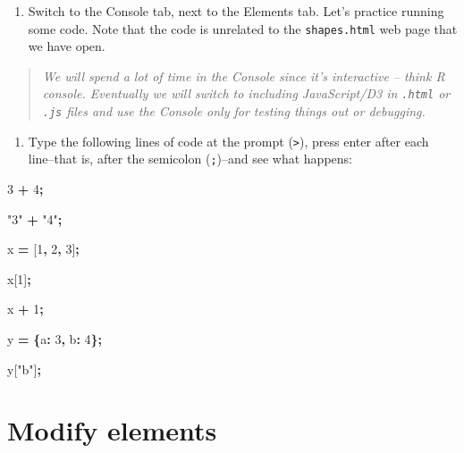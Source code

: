 \documentclass[openany]{book}
\newenvironment{Shaded}{\begin{snugshade}}{\end{snugshade}}
\newcommand{\DataTypeTok}[1]{\textcolor[rgb]{0.13,0.29,0.53}{#1}}
\newcommand{\DecValTok}[1]{\textcolor[rgb]{0.00,0.00,0.81}{#1}}
\newcommand{\NormalTok}[1]{#1}
\newcommand{\OperatorTok}[1]{\textcolor[rgb]{0.81,0.36,0.00}{\textbf{#1}}}
\newcommand{\StringTok}[1]{\textcolor[rgb]{0.31,0.60,0.02}{#1}}
\providecommand{\tightlist}{%
  \setlength{\itemsep}{0pt}\setlength{\parskip}{0pt}}
\begin{document}
\begin{enumerate}
\def\labelenumi{\arabic{enumi}.}
\tightlist
\item
  Switch to the Console tab, next to the Elements tab. Let's practice running some code. Note that the code is unrelated to the \texttt{shapes.html} web page that we have open.
\end{enumerate}

\begin{quote}
 \emph{We will spend a lot of time in the Console since it's interactive -- think R console. Eventually we will switch to including JavaScript/D3 in \texttt{.html} or \texttt{.js} files and use the Console only for testing things out or debugging.}
\end{quote}

\begin{enumerate}
\def\labelenumi{\arabic{enumi}.}
\setcounter{enumi}{1}
\tightlist
\item
  Type the following lines of code at the prompt (\texttt{\textgreater{}}), press enter after each line--that is, after the semicolon (\texttt{;})--and see what happens:
\end{enumerate}

\begin{Shaded}
\begin{Highlighting}[]
\DecValTok{3} \OperatorTok{+} \DecValTok{4}\OperatorTok{;}
    
\StringTok{"3"} \OperatorTok{+} \StringTok{"4"}\OperatorTok{;}

\NormalTok{ x }\OperatorTok{=}\NormalTok{ [}\DecValTok{1}\OperatorTok{,} \DecValTok{2}\OperatorTok{,} \DecValTok{3}\NormalTok{]}\OperatorTok{;}
    
\NormalTok{x[}\DecValTok{1}\NormalTok{]}\OperatorTok{;}
    
\NormalTok{x }\OperatorTok{+} \DecValTok{1}\OperatorTok{;}
    
\NormalTok{y }\OperatorTok{=} \OperatorTok{\{}\DataTypeTok{a}\OperatorTok{:} \DecValTok{3}\OperatorTok{,} \DataTypeTok{b}\OperatorTok{:} \DecValTok{4}\OperatorTok{\};}
    
\NormalTok{y[}\StringTok{"b"}\NormalTok{]}\OperatorTok{;}
\end{Highlighting}
\end{Shaded}

\hypertarget{modify-elements}{%
\section{Modify elements }\label{modify-elements}}
\end{document}
